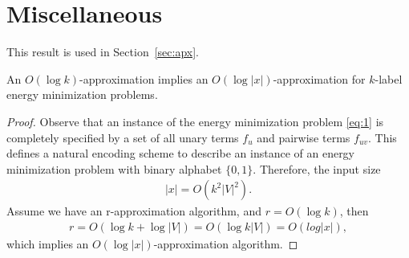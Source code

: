 \section{Miscellaneous}

This result is used in Section~\ref{sec:apx}.
\begin{corollary} \label{C:label-approx}
An $O(\log k)$-approximation implies an $O(\log |x|)$-approximation for $k$-label energy minimization problems.
\end{corollary}
\begin{proof}
Observe that an instance of the energy minimization problem \cref{eq:1} is completely specified by a set of all unary terms $f_u$ and pairwise terms $f_{uv}$. This defines a natural encoding scheme to describe an instance of an energy minimization problem with binary alphabet $\{0, 1\}$. Therefore, the input size
\begin{align}
|x| = O(k^2|V|^2).
\end{align}
Assume we have an r-approximation algorithm, and $r = O(\log k)$, then
\begin{align}
    r = O(\log k + \log |V|) = O(\log k|V|) = O(log|x|),
\end{align}
which implies an $O(\log |x|)$-approximation algorithm.

\end{proof}

